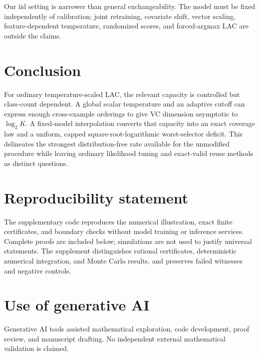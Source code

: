 \documentclass[10pt]{article}
\theoremstyle{definition}\newtheorem{definition}[theorem]{Definition}
\theoremstyle{remark}\newtheorem{remark}[theorem]{Remark}
\newcommand{\1}{\mathbf 1}
\begin{document}
Our iid setting is narrower than general exchangeability. The model must be fixed independently of calibration; joint retraining, covariate shift, vector scaling, feature-dependent temperature, randomized scores, and forced-argmax LAC are outside the claims. 

\section{Conclusion}
For ordinary temperature-scaled LAC, the relevant capacity is controlled but class-count dependent. A global scalar temperature and an adaptive cutoff can express enough cross-example orderings to give VC dimension asymptotic to $\log_2 K$. A fixed-model interpolation converts that capacity into an exact coverage law and a uniform, capped square-root-logarithmic worst-selector deficit. This delineates the strongest distribution-free rate available for the unmodified procedure while leaving ordinary likelihood tuning and exact-valid reuse methods as distinct questions.

\section*{Reproducibility statement}
The supplementary code reproduces the numerical illustration, exact finite certificates, and boundary checks without model training or inference services. Complete proofs are included below; simulations are not used to justify universal statements. The supplement distinguishes rational certificates, deterministic numerical integration, and Monte Carlo results, and preserves failed witnesses and negative controls.

\section*{Use of generative AI}
Generative AI tools assisted mathematical exploration, code development, proof review, and manuscript drafting. No independent external mathematical validation is claimed.




\clearpage
\appendix
\end{document}
